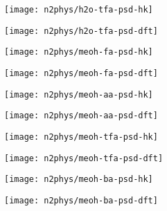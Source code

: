 \begin{figure}[!htb]
    \begin{subfigure}{0.25\linewidth}
        \texttt{[image: n2phys/h2o-tfa-psd-hk]}%
        \label{appx:def:fgr:psd-h2o-tfa-hk}
    \end{subfigure}%
    \begin{subfigure}{0.25\linewidth}
        \texttt{[image: n2phys/h2o-tfa-psd-dft]}%
        \label{appx:def:fgr:psd-h2o-tfa-dft}
    \end{subfigure}%
\end{figure}

\pagebreak
\begin{figure}[!htb]\ContinuedFloat{}
    \centering
    
    \begin{subfigure}{0.25\linewidth}
        \texttt{[image: n2phys/meoh-fa-psd-hk]}%
        \label{appx:def:fgr:psd-meoh-fa-hk}
    \end{subfigure}%
    \begin{subfigure}{0.25\linewidth}
        \texttt{[image: n2phys/meoh-fa-psd-dft]}%
        \label{appx:def:fgr:psd-meoh-fa-dft}
    \end{subfigure}%
    \begin{subfigure}{0.25\linewidth}
        \texttt{[image: n2phys/meoh-aa-psd-hk]}%
        \label{appx:def:fgr:psd-meoh-aa-hk}
    \end{subfigure}%
    \begin{subfigure}{0.25\linewidth}
        \texttt{[image: n2phys/meoh-aa-psd-dft]}%
        \label{appx:def:fgr:psd-meoh-aa-dft}
    \end{subfigure}%

    \begin{subfigure}{0.25\linewidth}
        \texttt{[image: n2phys/meoh-tfa-psd-hk]}%
        \label{appx:def:fgr:psd-meoh-tfa-hk}
    \end{subfigure}%
    \begin{subfigure}{0.25\linewidth}
        \texttt{[image: n2phys/meoh-tfa-psd-dft]}%
        \label{appx:def:fgr:psd-meoh-tfa-dft}
    \end{subfigure}%
    \begin{subfigure}{0.25\linewidth}
        \texttt{[image: n2phys/meoh-ba-psd-hk]}%
        \label{appx:def:fgr:psd-meoh-ba-hk}
    \end{subfigure}%
    \begin{subfigure}{0.25\linewidth}
        \texttt{[image: n2phys/meoh-ba-psd-dft]}%
        \label{appx:def:fgr:psd-meoh-ba-dft}
    \end{subfigure}%
    

\end{figure}
